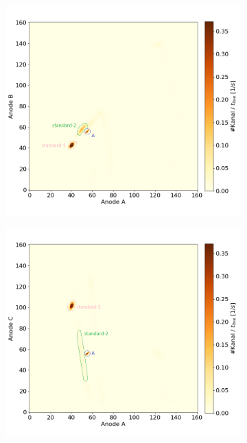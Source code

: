 \begin{figure}[H]
    \centering
    \begin{subfigure}{0.47\textwidth}
        \centering
        \includegraphics[width=\linewidth]{Pictures/Gasdetektor/22_standard_AB.png}
    \end{subfigure}
    \begin{subfigure}{0.47\textwidth}
        \centering
        \includegraphics[width=\linewidth]{Pictures/Gasdetektor/22_standard_AC.png}

\end{subfigure}
\end{figure}
